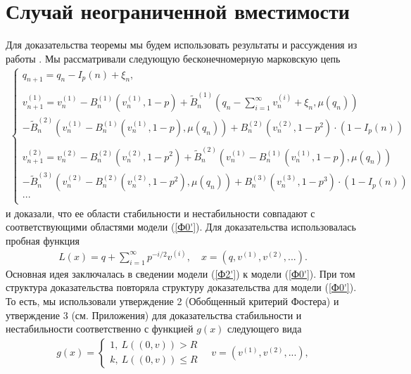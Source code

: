 \documentclass[10pt, reqno]{amsart}
\begin{document}
\section{Случай неограниченной вместимости}
Для доказательства теоремы мы будем использовать результаты и рассуждения из работы \cite{Rezler_Chebunin}. Мы рассматривали следующую бесконечномерную марковскую цепь
\small
\begin{align*}
\begin{cases}
q_{n+1} = q_{n} − I_{p}(n) + \xi_{n}, \\\\
v_{n+1}^{(1)} = v_{n}^{(1)} − B_{n}^{(1)}(v_{n}^{(1)}, 1-p) + \widetilde{B}_{n}^{(1)}(q_{n} − \sum_{i=1}^{\infty}v_{n}^{(i)} + \xi_{n}, \mu(q_{n})) \\- \widetilde{B}_{n}^{(2)}(v_{n}^{(1)} - B_{n}^{(1)}(v_{n}^{(1)}, 1-p), \mu(q_{n})) + B_{n}^{(2)}(v_{n}^{(2)}, 1-p^{2})\cdot(1-I_{p}(n))\\\\
v_{n+1}^{(2)} = v_{n}^{(2)} − B_{n}^{(2)}(v_{n}^{(2)}, 1-p^{2}) + \widetilde{B}_{n}^{(2)}(v_{n}^{(1)} − B_{n}^{(1)}(v_{n}^{(1)}, 1-p), \mu(q_{n})) \\- \widetilde{B}_{n}^{(3)}(v_{n}^{(2)} - B_{n}^{(2)}(v_{n}^{(2)}, 1-p^{2}), \mu(q_{n})) + B_{n}^{(3)}(v_{n}^{(3)}, 1-p^{3})\cdot(1-I_{p}(n))\\
...\\
\end{cases}
\tag{M2'}
\label{Ф2'}
\end{align*}
\normalsize
и доказали, что ее области стабильности и нестабильности совпадают с соответствующими областями модели (\ref{Ф0'}).  Для доказательства использовалась пробная функция
\begin{align}
    L(x) = q + \sum_{i=1}^{\infty}p^{-i/2}v^{(i)}, \quad x = (q, v^{(1)}, v^{(2)},...).
    \label{Lyapunov_function}
\end{align}
Основная идея заключалась в сведении модели (\ref{Ф2'}) к модели (\ref{Ф0'}). При том структура доказательства повторяла структуру доказательства для модели (\ref{Ф0'}). То есть, мы использовали утверждение 2 (Обобщенный критерий Фостера) и утверждение 3 (см. Приложения) для доказательства стабильности и нестабильности соответственно с функцией $g(x)$ следующего вида
\begin{align*}
    g(x) = \begin{cases}
    1,\: L((0, v)) > R\\
    k,\: L((0, v)) \leq R
    \end{cases} \quad v = (v^{(1)}, v^{(2)},...),
\end{align*}
\end{document}
